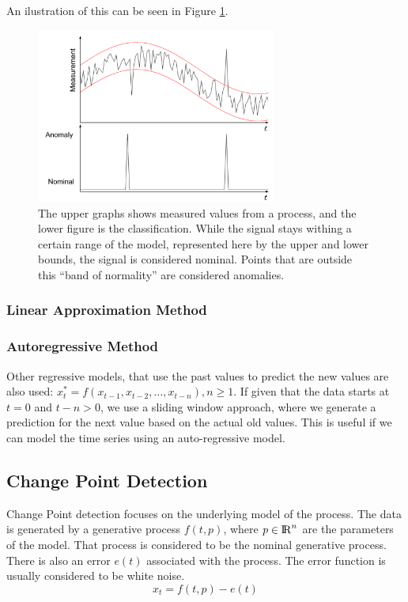\documentclass[a4paper, 10pt]{article}
\begin{document}
An ilustration of this can be seen in Figure \ref{fig:outlier}. \\

\begin{figure}
\centering
\includegraphics[width=0.7\textwidth]{Outlier}
\caption{The upper graphs shows measured values from a process, and the lower figure is the classification. While the signal stays withing a certain range of the model, represented here by the upper and lower bounds, the signal is considered nominal. Points that are outside this ``band of normality'' are considered anomalies.}
\label{fig:outlier}
\end{figure}

\subsubsection{Linear Approximation Method}

\subsubsection{Autoregressive Method}

Other regressive models, that use the past values to predict the new values are also used: $x_t^* = f(x_{t-1}, x_{t-2}, \dots, x_{t-n}), n \ge 1$. If given that the data starts at $t=0$ and $t-n > 0$, we use a sliding window approach, where we generate a prediction for the next value based on the actual old values. This is useful if we can model the time series using an auto-regressive model.

\subsection{Change Point Detection}

Change Point detection focuses on the underlying model of the process. The data is generated by a generative process $f(t, p)$, where $p \in {\rm I\!R}^n$ are the parameters of the model. That process is considered to be the nominal generative process. There is also an error $e(t)$ associated with the process. The error function is usually considered to be white noise.
$$x_t = f(t, p) - e(t)$$
\end{document}
